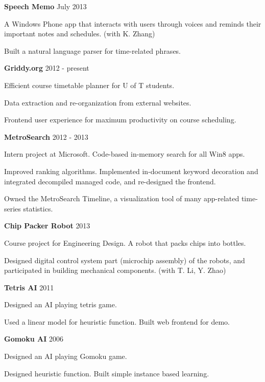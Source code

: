 {\bf Speech Memo} \hfill {July 2013}\\
\begin{list3}
\item A Windows Phone app that interacts with users through voices and reminds their important notes and schedules. (with K. Zhang)
\item Built a natural language parser for time-related phrases.
\end{list3}

{\bf Griddy.org} \hfill {2012 - present}\\
\begin{list3}
\item Efficient course timetable planner for U of T students.
\item Data extraction and re-organization from external websites.
\item Frontend user experience for maximum productivity on course scheduling.
\end{list3}

{\bf MetroSearch} \hfill {2012 - 2013}\\
\begin{list3}
\item Intern project at Microsoft. Code-based in-memory search for all Win8 apps. 
\item Improved ranking algorithms. Implemented in-document keyword decoration and integrated decompiled managed code, and re-designed the frontend.
\item Owned the MetroSearch Timeline, a visualization tool of many app-related time-series statistics.
\end{list3}

{\bf Chip Packer Robot} \hfill {2013}\\
\begin{list3}
\item Course project for Engineering Design. A robot that packs chips into bottles. 
\item Designed digital control system part (microchip assembly) of the robots, and participated in building mechanical components. (with T. Li, Y. Zhao)
\end{list3}

{\bf Tetris AI} \hfill {2011} \\
\begin{list3}
\item Designed an AI playing tetris game. 
\item Used a linear model for heuristic function. Built web frontend for demo.
\end{list3}

{\bf Gomoku AI} \hfill {2006} \\
\begin{list3}
\item Designed an AI playing Gomoku game. 
\item Designed heuristic function. Built simple instance based learning.
\end{list3}
